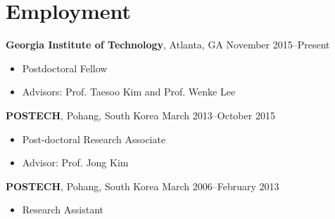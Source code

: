 \section*{Employment}

\begin{description}
\item {\bf Georgia Institute of Technology}, Atlanta, GA \dotfill November 2015--Present
  \begin{itemize}
  \item Postdoctoral Fellow
  \item Advisors: Prof. Taesoo Kim and Prof. Wenke Lee
  \end{itemize}
  
\item {\bf POSTECH}, Pohang, South Korea \dotfill March 2013--October 2015
  \begin{itemize}
  \item Post-doctoral Research Associate
  \item Advisor: Prof. Jong Kim
  \end{itemize}

\item {\bf POSTECH}, Pohang, South Korea \dotfill March 2006--February 2013
  \begin{itemize}
  \item Research Assistant
  \end{itemize}
\end{description}
